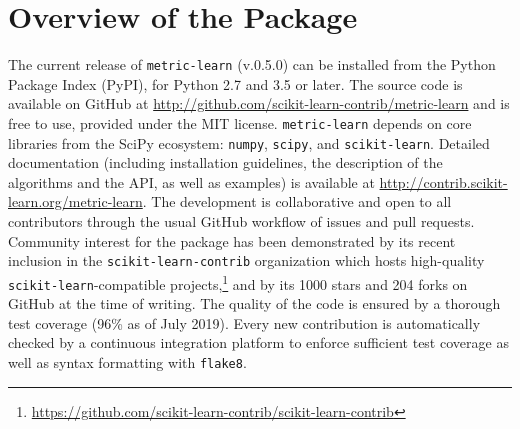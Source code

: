 \documentclass[twoside,11pt]{article}
\newcommand{\aurelien}[1]{\todo[inline,caption={},color=orange!40]{{\it Aurelien:~}#1}}
\begin{document}

\section{Overview of the Package}

The current release of \texttt{metric-learn} (v.0.5.0) can be installed from the Python Package Index (PyPI), for Python 2.7 and 3.5 or later. 
The source code is available on GitHub at \url{http://github.com/scikit-learn-contrib/metric-learn} and is free to use, provided under the MIT license. 
\texttt{metric-learn} depends on core libraries from the SciPy ecosystem: \texttt{numpy}, \texttt{scipy}, and \texttt{scikit-learn}.
Detailed documentation (including installation guidelines, the description of the algorithms and the API, as well as examples) is available at \url{http://contrib.scikit-learn.org/metric-learn}.
The development is collaborative and open to all contributors through the usual GitHub workflow of issues and pull requests.
Community interest for the package has been demonstrated by its recent inclusion in the \texttt{scikit-learn-contrib} organization which hosts high-quality \texttt{scikit-learn}-compatible projects,\footnote{\url{https://github.com/scikit-learn-contrib/scikit-learn-contrib}} and by its 1000 stars and 204 forks on GitHub at the time of writing.
The quality of the code is ensured by a thorough test coverage (96\% as of July 2019).
Every new contribution is automatically checked by a continuous integration platform to enforce sufficient test coverage as well as syntax formatting with \texttt{flake8}. %
\end{document}

